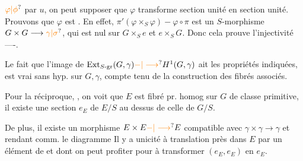 $\unsure{\varphi|\phi}$ par $u$, on peut supposer que $\varphi$ transforme section unité en section unité. Prouvons que $\varphi$ est \uline{}. En effet, $\pi'(\varphi\times_S\varphi)-\varphi\circ\pi$ est un $S$-morphisme $G\times G\longrightarrow\unsure{\gamma|\sigma}$, qui est nul sur $G\times_S e$ et $e\times_S G$.
Donc cela prouve l'injectivité ----.

Le fait que l'image de $\operatorname{Ext}_{S\text{-gr}}(G,\gamma)\unsure{-|\longrightarrow}H^1(G,\gamma)$ ait les propriétés indiquées, est  vrai sans hyp. sur $G,\gamma$, compte tenu de la construction des fibrés associés.

Pour la réciproque, , on voit que  $E$ est fibré pr. homog sur $G$  de classe primitive, il existe  une section $e_E$ de $E/S$ au dessus de celle de $G/S$.


De plus, il existe un morphisme $E\times E\unsure{-|\longrightarrow}E$ compatible avec $\gamma\times\gamma\longrightarrow\gamma$ et rendant comm. le diagramme
Il y a unicité à translation près dans $E$ par un élément de \deleted{$\unsure{\gamma}$} et dont on peut profiter pour   à transformer $(e_E,e_E)$ en $e_E$.

